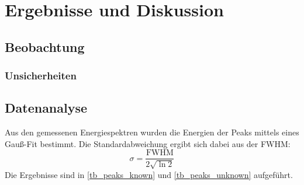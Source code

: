 \documentclass[
	a4paper,
	12pt,
	pagesize,
	ngerman
]{scrartcl}
\begin{document}
	\section{Ergebnisse und Diskussion}
	

	\subsection{Beobachtung}
	\subsubsection{Unsicherheiten} %
	\subsection{Datenanalyse}
	Aus den gemessenen Energiespektren wurden die Energien der Peaks mittels eines Gauß-Fit bestimmt.
	Die Standardabweichung ergibt sich dabei aus der FWHM:
	\begin{equation}
		\sigma = \frac{\text{FWHM}}{2\sqrt{\ln 2}}
	\end{equation}
	Die Ergebnisse sind in \cref{tb_peaks_known} und \cref{tb_peaks_unknown} aufgeführt.
	
	
\end{document}
